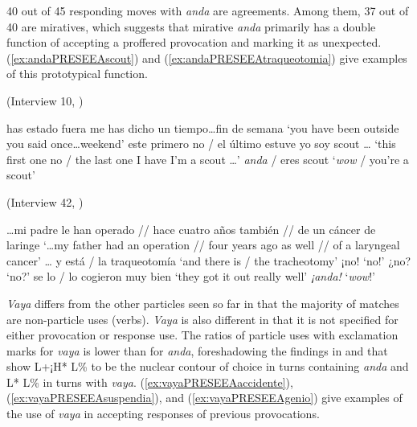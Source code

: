 40 out of 45 responding moves with \textit{anda} are agreements. Among them, 37 out of 40 are miratives, which suggests that mirative \textit{anda} primarily has a double function of accepting a proffered provocation and marking it as unexpected. (\ref{ex:andaPRESEEAscout}) and (\ref{ex:andaPRESEEAtraqueotomia}) give examples of this prototypical function.

\begin{exe} 
	\ex \label{ex:andaPRESEEAscout} 
	(Interview 10, \cite{PRESEEA.20142020})
	\begin{xlist}[A:]
	 has estado fuera me has dicho un tiempo\ldots fin de semana 
	\glt `you have been outside you said once\ldots weekend' 
	 este primero no / el último estuve yo soy scout \ldots 
	\glt `this first one no / the last one I have I'm a scout \ldots' 
	 \textit{anda} / eres scout
	\glt `\textit{wow} / you're a scout' 
	\end{xlist}
	\ex \label{ex:andaPRESEEAtraqueotomia} (Interview 42, \cite{PRESEEA.20142020}) 
	\begin{xlist}[A:]
	\ldots mi padre le han operado // hace cuatro años también // de un cáncer de laringe 
	\glt `\ldots my father had an operation // four years ago as well // of a laryngeal cancer' \ldots 
	 y está / la traqueotomía
	\glt `and there is / the tracheotomy' 
	 ¡no!
	\glt `no!'
	 ¿no?
	\glt `no?' 
	 se lo / lo cogieron muy bien
	\glt `they got it out really well' 
	\textit{¡anda!}
	\glt `\textit{wow}!' 
	\end{xlist}
\end{exe}

\textit{Vaya} differs from the other particles seen so far in that the majority of matches are non-particle uses (verbs). \textit{Vaya} is also different in that it is not specified for either provocation or response use. The ratios of particle uses with exclamation marks for \textit{vaya} is lower than for \textit{anda}, foreshadowing the findings in  and  that show L+¡H* L\% to be the nuclear contour of choice in turns containing \textit{anda} and L* L\% in turns with \textit{vaya}. (\ref{ex:vayaPRESEEAaccidente}), (\ref{ex:vayaPRESEEAsuspendia}), and (\ref{ex:vayaPRESEEAgenio}) give examples of the use of \textit{vaya} in accepting responses of previous provocations.

